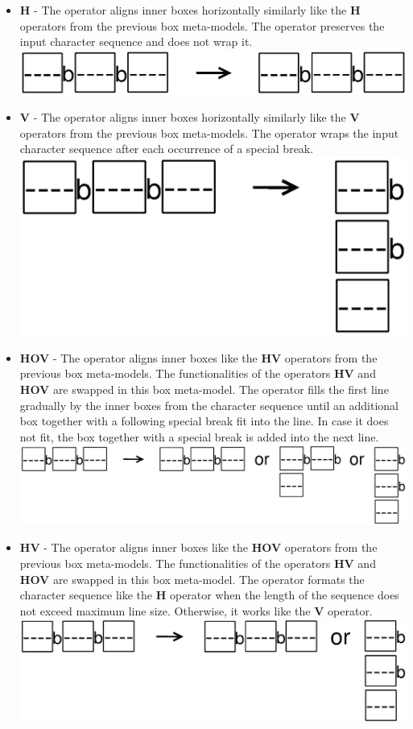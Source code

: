 \documentclass[12pt,notitlepage,a4paper]{report}
\begin{document}
\begin{itemize}
\item \textbf{H} - The operator aligns inner boxes horizontally similarly like the \textbf{H} operators from the previous box meta-models. The operator preserves the input character sequence and does not wrap it.
\includegraphics[scale=0.4]{pictures/OCaml-H.eps}
\item \textbf{V} - The operator aligns inner boxes horizontally similarly like the \textbf{V} operators from the previous box meta-models. The operator wraps the input character sequence after each  occurrence of a special break.
\includegraphics[scale=0.4]{pictures/OCaml-V.eps}
\item \textbf{HOV} - The operator aligns inner boxes like the \textbf{HV} operators from the previous box meta-models. The functionalities of the operators \textbf{HV} and \textbf{HOV} are swapped in this box meta-model. The operator fills the first line gradually by the inner boxes from the character sequence until an additional box together with a following special break fit into the line. In case it does not fit, the box together with a special break is added into the next line.
\includegraphics[scale=0.4]{pictures/OCaml-HOV.eps}
\item \textbf{HV} - The operator aligns inner boxes like the \textbf{HOV} operators from the previous box meta-models. The functionalities of the operators \textbf{HV} and \textbf{HOV} are swapped in this box meta-model. The operator formats the character sequence like the \textbf{H} operator when the length of the sequence does not exceed maximum line size. Otherwise, it works like the \textbf{V} operator. \newpage
\includegraphics[scale=0.4]{pictures/OCaml-HV.eps}


\end{itemize}
\end{document}
